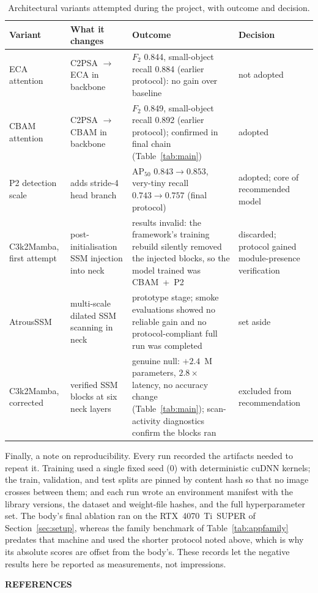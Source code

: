 \documentclass[12pt,a4paper,oneside]{report}
\begin{document}
\begin{table}[H]
  \centering
  \caption{Architectural variants attempted during the project, with outcome and decision.}
  \label{tab:apphistory}
  \small
  \setlength{\tabcolsep}{4pt}
  \begin{tabular}{@{}p{2.9cm} p{4.3cm} p{4.4cm} p{2.4cm}@{}}
    \toprule
    \textbf{Variant} & \textbf{What it changes} & \textbf{Outcome} & \textbf{Decision} \\
    \midrule
    ECA attention & C2PSA $\to$ ECA in backbone & $F_2$ 0.844, small-object recall 0.884 (earlier protocol): no gain over baseline & not adopted \\
    CBAM attention & C2PSA $\to$ CBAM in backbone & $F_2$ 0.849, small-object recall 0.892 (earlier protocol); confirmed in final chain (Table~\ref{tab:main}) & adopted \\
    P2 detection scale & adds stride-4 head branch & $\mathrm{AP}_{50}$ $0.843 \to 0.853$, very-tiny recall $0.743 \to 0.757$ (final protocol) & adopted; core of recommended model \\
    C3k2Mamba, first attempt & post-initialisation SSM injection into neck & results invalid: the framework's training rebuild silently removed the injected blocks, so the model trained was CBAM~+~P2 & discarded; protocol gained module-presence verification \\
    AtrousSSM & multi-scale dilated SSM scanning in neck & prototype stage; smoke evaluations showed no reliable gain and no protocol-compliant full run was completed & set aside \\
    C3k2Mamba, corrected & verified SSM blocks at six neck layers & genuine null: $+2.4$~M parameters, $2.8\times$ latency, no accuracy change (Table~\ref{tab:main}); scan-activity diagnostics confirm the blocks ran & excluded from recommendation \\
    \bottomrule
  \end{tabular}
\end{table}

Finally, a note on reproducibility. Every run recorded the artifacts needed to
repeat it. Training used a single fixed seed (0) with deterministic cuDNN
kernels; the train, validation, and test splits are pinned by content hash so
that no image crosses between them; and each run wrote an environment manifest
with the library versions, the dataset and weight-file hashes, and the full
hyperparameter set. The body's final ablation ran on the RTX~4070~Ti~SUPER of
Section~\ref{sec:setup}, whereas the family benchmark of
Table~\ref{tab:appfamily} predates that machine and used the shorter protocol
noted above, which is why its absolute scores are offset from the body's. These
records let the negative results here be reported as measurements, not
impressions.

\clearpage
{}
{}
\begin{center}{\fontsize{14}{21}\selectfont\bfseries REFERENCES}\end{center}
\printbibliography[heading=none]
\end{document}
